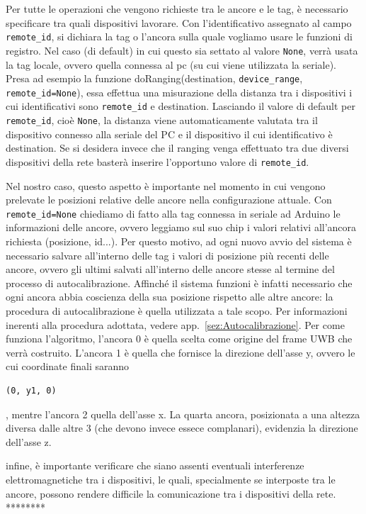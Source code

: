 Per tutte le operazioni che vengono richieste tra le ancore e le tag, è necessario specificare tra quali dispositivi lavorare. 
Con l'identificativo assegnato al campo \verb|remote_id|, si dichiara la tag o l'ancora sulla quale vogliamo usare le funzioni di registro. Nel caso (di default)
in cui questo sia settato al valore \verb|None|, verrà usata la tag locale, ovvero quella connessa al pc (su cui viene utilizzata la seriale).
Presa ad esempio la funzione doRanging(destination, \verb|device_range|, \verb|remote_id=None|), essa effettua una misurazione della distanza tra i dispositivi i cui identificativi sono
\verb|remote_id| e destination. Lasciando il valore di default per \verb|remote_id|, cioè \verb|None|, la distanza viene automaticamente valutata tra il dispositivo connesso alla seriale del PC e il
dispositivo il cui identificativo è destination. 
Se si desidera invece che il ranging venga effettuato tra due diversi dispositivi della rete basterà inserire l’opportuno valore di \verb|remote_id|.

Nel nostro caso, questo aspetto è importante nel momento in cui vengono prelevate le posizioni relative delle ancore nella configurazione attuale. Con \verb|remote_id=None| chiediamo di fatto
alla tag connessa in seriale ad Arduino le informazioni delle ancore, ovvero leggiamo sul suo chip i valori relativi all'ancora richiesta (posizione, id...).
Per questo motivo, ad ogni nuovo avvio del sistema è necessario salvare all'interno delle tag i valori di posizione più recenti delle ancore, ovvero gli ultimi salvati all'interno delle ancore stesse
al termine del processo di autocalibrazione.
Affinché il sistema funzioni è infatti necessario che ogni ancora abbia coscienza della sua posizione rispetto alle altre ancore: la procedura di autocalibrazione è quella utilizzata a tale scopo.
Per informazioni inerenti alla procedura adottata, vedere app.~\ref{sez:Autocalibrazione}. Per come funziona l'algoritmo, l'ancora 0 è quella scelta come origine del frame UWB che verrà costruito. 
L'ancora 1 è quella che fornisce la direzione dell'asse y, ovvero le cui coordinate finali saranno \begin{verbatim}(0, y1, 0)\end{verbatim}, mentre l'ancora 2 quella dell'asse x. La quarta ancora, 
posizionata a una altezza diversa dalle altre 3 (che devono invece essece complanari), evidenzia la direzione dell'asse z.




infine, è importante verificare che siano assenti eventuali interferenze elettromagnetiche tra i dispositivi, le quali, specialmente se interposte tra le ancore, 
possono rendere difficile la comunicazione tra i dispositivi della rete.
********


